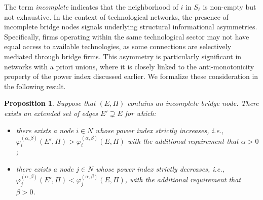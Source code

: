 \documentclass[preprint,11pt,authoryear]{elsarticle}
\theoremstyle{plain}
\newtheorem{proposition}[theorem]{Proposition}
\begin{document}
The term \emph{incomplete} indicates that the neighborhood of \( i \) in \( S_\ell \) is non-empty but not exhaustive.
In the context of technological networks, the presence of incomplete bridge nodes signals underlying structural informational asymmetries. Specifically, firms operating within the same technological sector may not have equal access to available technologies, as some connections are selectively mediated through bridge firms. This asymmetry is particularly significant in networks with a priori unions, where it is closely linked to the anti-monotonicity property of the power index discussed earlier. We formalize these consideration in the following result.
\begin{proposition} \label{monot}
Suppose that \( (E, \Pi) \) contains an incomplete bridge node. 
There exists an extended set of edges \( E' \supsetneq E \) for which:
\begin{itemize}
\item[-] there exists a node \( i \in N \) whose power index strictly increases, i.e., \( \varphi_i^{(\alpha,\beta)}(E', \Pi) > \varphi_i^{(\alpha,\beta)}(E, \Pi) \)
with the additional requirement that \( \alpha > 0 \);
\item[-] 
there exists a node \( j \in N \) whose power index strictly decreases, i.e.,    
$\varphi_j^{(\alpha,\beta)}(E', \Pi) < \varphi_j^{(\alpha,\beta)}(E, \Pi)$,
with the additional requirement that \( \beta > 0 \).
\end{itemize}
\end{proposition}
\end{document}
